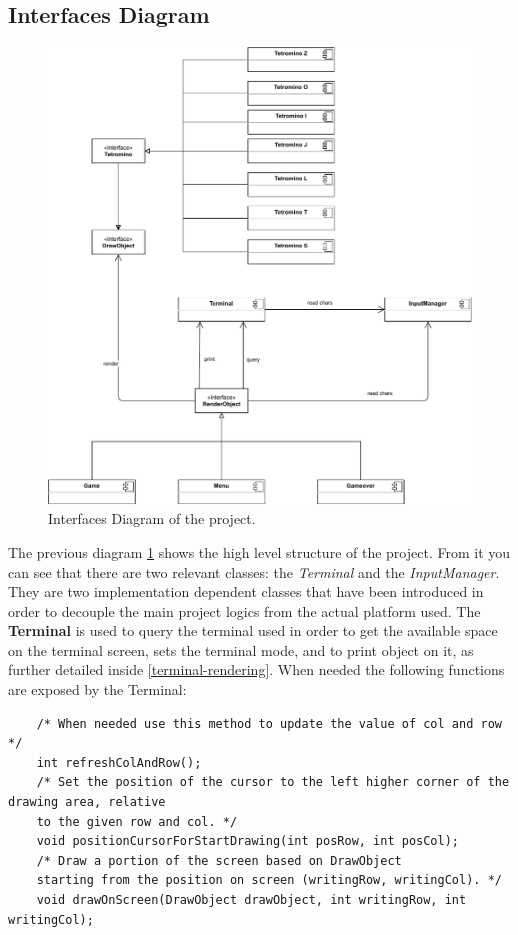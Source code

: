 \documentclass{article}
\begin{document}
\subsection{Interfaces Diagram}
\begin{figure}[H]
    \centering
    \includegraphics[width=\linewidth]{img/InterafcesDiagram.pdf}
    \caption{Interfaces Diagram of the project.}
    \label{fig:interface}
\end{figure}
The previous diagram \ref{fig:interface} shows the high level structure of the project. From it you can see that there are two relevant classes: the \textit{Terminal} and the \textit{InputManager}.
They are two implementation dependent classes that have been introduced in order to decouple the main project logics from the actual platform used.
The \textbf{Terminal} is used to query the terminal used in order to get the available space on the terminal screen, sets the terminal mode, and to print object on it, as further detailed inside \ref{terminal-rendering}.
When needed the following functions are exposed by the Terminal:
\begin{verbatim}
    /* When needed use this method to update the value of col and row */
    int refreshColAndRow();
    /* Set the position of the cursor to the left higher corner of the drawing area, relative
    to the given row and col. */
    void positionCursorForStartDrawing(int posRow, int posCol);
    /* Draw a portion of the screen based on DrawObject
    starting from the position on screen (writingRow, writingCol). */
    void drawOnScreen(DrawObject drawObject, int writingRow, int writingCol);
\end{verbatim}
\end{document}
